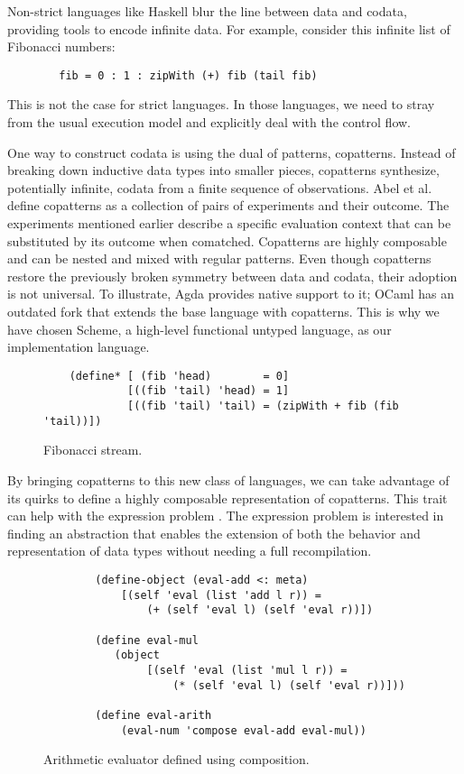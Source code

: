 Non-strict languages like Haskell blur the line between data and codata, providing tools to encode infinite data.
For example, consider this infinite list of Fibonacci numbers:
    \begin{verbatim}
        fib = 0 : 1 : zipWith (+) fib (tail fib)
    \end{verbatim}
This is not the case for strict languages. In those languages, we need to stray from the usual execution model and explicitly deal with the control flow.

One way to construct codata is using the dual of patterns, copatterns.
Instead of breaking down inductive data types into smaller pieces, copatterns synthesize, potentially infinite, codata from a finite sequence of observations.
Abel et al. \cite{APTS2013C} define copatterns as a collection of pairs of experiments and their outcome.
The experiments mentioned earlier describe a specific evaluation context that can be substituted by its outcome when comatched.
Copatterns are highly composable and can be nested and mixed with regular patterns.
Even though copatterns restore the previously broken symmetry between data and codata, their adoption is not universal.
To illustrate, Agda provides native support to it; OCaml has an outdated fork that extends the base language with copatterns.
This is why we have chosen Scheme, a high-level functional untyped language, as our implementation language.

\begin{figure}
    \begin{verbatim}
    (define* [ (fib 'head)        = 0]
             [((fib 'tail) 'head) = 1]
             [((fib 'tail) 'tail) = (zipWith + fib (fib 'tail))])
    \end{verbatim}
    \caption{Fibonacci stream.}
    \label{fig:ex-fib}
\end{figure}

By bringing copatterns to this new class of languages, we can take advantage of its quirks to define a highly composable representation of copatterns.
This trait can help with the expression problem \cite{ExpressionProblem}.
The expression problem is interested in finding an abstraction that enables the extension of both the behavior and representation of data types without needing a full recompilation.
\begin{figure}
    \begin{verbatim}
        (define-object (eval-add <: meta)
            [(self 'eval (list 'add l r)) =
                (+ (self 'eval l) (self 'eval r))])

        (define eval-mul
           (object
                [(self 'eval (list 'mul l r)) =
                    (* (self 'eval l) (self 'eval r))]))
      
        (define eval-arith
            (eval-num 'compose eval-add eval-mul))
    \end{verbatim}
    \caption{Arithmetic evaluator defined using composition.}
    \label{fig:ex-arith-eval}
\end{figure}

